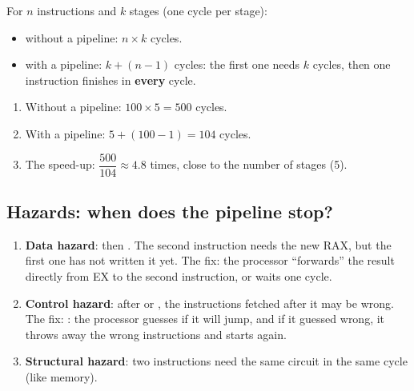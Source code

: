 \begin{center}
\end{center}

\begin{tarif}
    For $n$ instructions and $k$ stages (one cycle per stage):
    \begin{itemize}
        \item without a pipeline: $n \times k$ cycles.
        \item with a pipeline: $k + (n - 1)$ cycles: the first one needs $k$ cycles, then one instruction finishes in \textbf{every} cycle.
    \end{itemize}
\end{tarif}

\begin{khatwa}
    \begin{enumerate}
        \item Without a pipeline: $100 \times 5 = 500$ cycles.
        \item With a pipeline: $5 + (100 - 1) = 104$ cycles.
        \item The speed-up: $\dfrac{500}{104} \approx 4.8$ times, close to the number of stages (5).
    \end{enumerate}
\end{khatwa}

\subsection{Hazards: when does the pipeline stop?}
\begin{enumerate}
    \item \textbf{Data hazard}:  then . The second instruction needs the new RAX,
          but the first one has not written it yet. The fix: the processor ``forwards'' the result directly from EX to the
          second instruction, or waits one cycle.
    \item \textbf{Control hazard}: after  or , the instructions fetched after it may be wrong. The fix:
          : the processor guesses if it will jump, and if it guessed wrong,
          it throws away the wrong instructions and starts again.
    \item \textbf{Structural hazard}: two instructions need the same circuit in the same cycle (like memory).
\end{enumerate}

